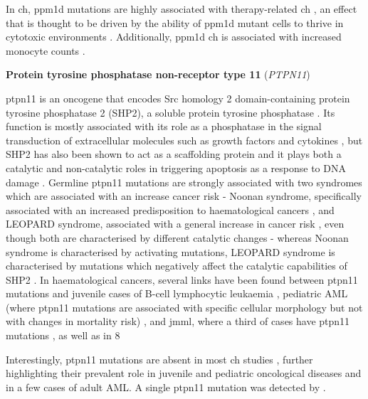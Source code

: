 In \ac{ch}, \ac{ppm1d} mutations are highly associated with therapy-related \ac{ch} \cite{Hsu2018-cc,Zajkowicz2015-nw,Bolton2020-ct,Zehir2017-gh}, an effect that is thought to be driven by the ability of \ac{ppm1d} mutant cells to thrive in cytotoxic environments \cite{Hsu2018-ta}. Additionally, \ac{ppm1d} \ac{ch} is associated with increased monocyte counts \cite{Dawoud2020-af}.

\noindent \textbf{Protein tyrosine phosphatase non-receptor type 11} (\textit{PTPN11})

\Ac{ptpn11} is an oncogene that encodes Src homology 2 domain-containing protein tyrosine phosphatase 2 (SHP2), a soluble protein tyrosine phosphatase \cite{Chan2007-xf}. Its function is mostly associated with its role as a phosphatase in the signal transduction of extracellular molecules such as growth factors and cytokines \cite{Chan2008-zh}, but SHP2 has also been shown to act as a scaffolding protein \cite{Bennett1994-wa,Li1994-xn} and it plays both a catalytic and non-catalytic roles in triggering apoptosis as a response to DNA damage \cite{Yuan2005-xt}. Germline \ac{ptpn11} mutations are strongly associated with two syndromes which are associated with an increase cancer risk - Noonan syndrome, specifically associated with an increased predisposition to haematological cancers \cite{Tartaglia2001-ru},  and LEOPARD syndrome, associated with a general increase in cancer risk \cite{Digilio2002-nq}, even though both are characterised by different catalytic changes - whereas Noonan syndrome is characterised by activating mutations, LEOPARD syndrome is characterised by mutations which negatively affect the catalytic capabilities of SHP2 \cite{Kontaridis2006-ia}. In haematological cancers, several links have been found between \ac{ptpn11} mutations and juvenile cases of B-cell lymphocytic leukaemia \cite{Tartaglia2004-lc}, pediatric AML (where \ac{ptpn11} mutations are associated with specific cellular morphology but not with changes in mortality risk) \cite{Loh2004-fg}, and \ac{jmml}, where a third of cases have \ac{ptpn11} mutations \cite{Tartaglia2003-xw,Kratz2005-qh}, as well as in 8%

Interestingly, \ac{ptpn11} mutations are absent in most \ac{ch} studies \cite{Zehir2017-gh,Genovese2014-eu,Xie2014-np,Jaiswal2014-rl,Bolton2020-ct,Zink2017-zi,McKerrell2015-rl}, further highlighting their prevalent role in juvenile and pediatric oncological diseases and in a few cases of adult AML. A single \ac{ptpn11} mutation was detected by  \cite{Acuna-Hidalgo2017-ng}.

